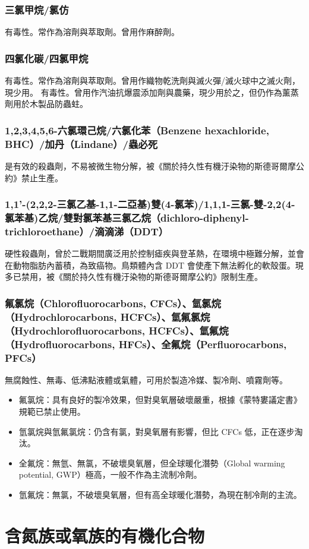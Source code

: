 \documentclass[a4paper,12pt]{report}
\begin{document}
\begin{itemize}
\subsubsection{三氯甲烷/氯仿}
有毒性。常作為溶劑與萃取劑。曾用作麻醉劑。
\subsubsection{四氯化碳/四氯甲烷}
有毒性。常作為溶劑與萃取劑。曾用作織物乾洗劑與滅火彈/滅火球中之滅火劑，現少用。
有毒性。曾用作汽油抗爆震添加劑與農藥，現少用於之，但仍作為薰蒸劑用於木製品防蟲蛀。
\subsubsection{1,2,3,4,5,6-六氯環己烷/六氯化苯（Benzene hexachloride, BHC）/加丹（Lindane）/蟲必死}
是有效的殺蟲劑，不易被微生物分解，被《關於持久性有機汙染物的斯德哥爾摩公約》禁止生產。
\subsubsection{1,1'-(2,2,2-三氯乙基-1,1-二亞基)雙(4-氯苯)/1,1,1-三氯-雙-2,2(4-氯苯基)乙烷/雙對氯苯基三氯乙烷（dichloro-diphenyl-trichloroethane）/滴滴涕（DDT）}
硬性殺蟲劑，曾於二戰期間廣泛用於控制瘧疾與登革熱，在環境中極難分解，並會在動物脂肪內蓄積，為致癌物。鳥類體內含 DDT 會使產下無法孵化的軟殼蛋。現多已禁用，被《關於持久性有機汙染物的斯德哥爾摩公約》限制生產。
\subsubsection{氟氯烷（Chlorofluorocarbons, CFCs）、氫氯烷（Hydrochlorocarbons, HCFCs）、氫氟氯烷（Hydrochlorofluorocarbons, HCFCs）、氫氟烷（Hydrofluorocarbons, HFCs）、全氟烷（Perfluorocarbons, PFCs）}
無腐蝕性、無毒、低沸點液體或氣體，可用於製造冷媒、製冷劑、噴霧劑等。
\begin{itemize}
\item 氟氯烷：具有良好的製冷效果，但對臭氧層破壞嚴重，根據《蒙特婁議定書》規範已禁止使用。
\item 氫氯烷與氫氟氯烷：仍含有氯，對臭氧層有影響，但比 CFCs 低，正在逐步淘汰。
\item 全氟烷：無氫、無氯，不破壞臭氧層，但全球暖化潛勢（Global warming potential, GWP）極高，一般不作為主流制冷劑。
\item 氫氟烷：無氯，不破壞臭氧層，但有高全球暖化潛勢，為現在制冷劑的主流。
\end{itemize}


\section{含氮族或氧族的有機化合物}

\end{itemize}
\end{document}
